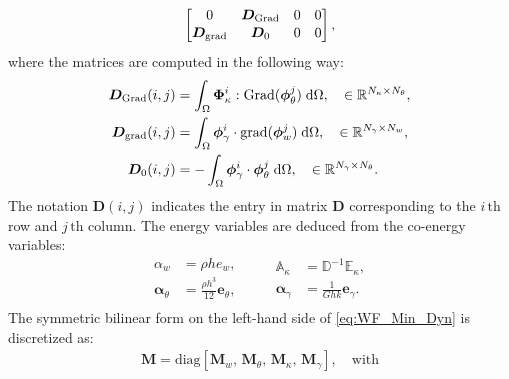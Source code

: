 \documentclass[11pt]{article}
\begin{document}
{\begin{equation}
\begin{bmatrix}
		0 & \bm{D}_{\mathrm{Grad}} & 0 & 0         \vspace{.3mm}\\
		\bm{D}_{\mathrm{grad}} & \bm{D}_0 & 0 & 0       \vspace{.3mm}\\
		\end{bmatrix},
		\end{equation}
		where the matrices are computed in the following way:
		\begin{equation}
		\begin{aligned}
		\bm{D}_{\mathrm{Grad}}(i,j) &= \int_{\Omega} \bm{\Phi}_{\kappa}^i : \mathrm{Grad} (\bm{\phi}_{\theta}^j) \d\Omega, \quad \in \mathbb{R}^{N_\kappa \times N_\theta},\\
		\bm{D}_{\mathrm{grad}}(i,j) &= \int_{\Omega} \bm{\phi}_{\gamma}^i \cdot  \mathrm{grad}(\bm{\phi}^j_{w}) \d\Omega, \quad \in \mathbb{R}^{N_{\gamma} \times N_w},\\
		\bm{D}_0(i,j)  &= -\int_{\Omega} \bm{\phi}_{\gamma}^i \cdot  \bm{\phi}^j_{\theta} \d\Omega, \quad \in \mathbb{R}^{N_{\gamma} \times N_\theta}. \\
		\end{aligned}
		\end{equation}
		The notation $\bm{D}(i,j)$ indicates the entry in matrix $\bm{D}$ corresponding to the $i \, {\text{th}}$ row and $j \,{\text{th}}$ column. The energy variables are deduced from the co-energy variables:
		\begin{equation}
		\begin{aligned}
		\alpha_w &= \rho h e_w, \\
		\bm\alpha_{\theta} &=  \frac{\rho h^3}{12} \bm{e}_{\theta}, \\
		\end{aligned} \qquad
		\begin{aligned}
		\mathbb{A}_{\kappa} &= \mathbb{D}^{-1} \mathbb{E}_{\kappa}, \\
		\bm\alpha_{\gamma} &= \frac{1}{G h k} \bm{e}_{\gamma}. \\
		\end{aligned}
		\end{equation}
		The symmetric bilinear form on the left-hand side of \eqref{eq:WF_Min_Dyn} is discretized as:
		\begin{equation}
		\begin{gathered}
		\bm{M} = \text{diag}[\bm{M}_w,\, \bm{M}_\theta,\, \bm{M}_\kappa,\, \bm{M}_{\gamma}], \quad \text{with} \\
		\begin{aligned}

\end{aligned}
\end{gathered}
\end{equation}}
\end{document}
